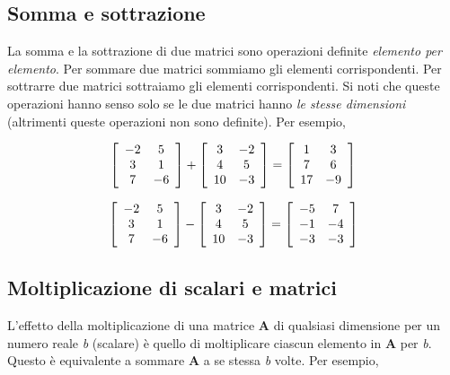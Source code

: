 \documentclass[
  11pt,
]{krantz}
\theoremstyle{definition}
\theoremstyle{definition}
\theoremstyle{definition}
\theoremstyle{definition}
\theoremstyle{remark}
\begin{document}
\hypertarget{somma-e-sottrazione}{%
\subsection{Somma e sottrazione}\label{somma-e-sottrazione}}

La somma e la sottrazione di due matrici sono operazioni definite \emph{elemento per elemento}. Per sommare due matrici sommiamo gli elementi corrispondenti. Per sottrarre due matrici sottraiamo gli elementi corrispondenti. Si noti che queste operazioni hanno senso solo se le due matrici hanno \emph{le stesse dimensioni} (altrimenti queste operazioni non sono definite). Per esempio,

\[\left[ \begin{array}{c c}
-2 & 5\\
3 & 1\\
7 & -6
\end{array}
 \right]+
\left[ \begin{array}{c c}
3 & -2\\
4 & 5\\
10 & -3
\end{array}
 \right]=
 \left[ \begin{array}{c c}
1 & 3\\
7 & 6\\
17 & -9
\end{array}
 \right]\]

\[\left[ \begin{array}{c c}
-2 & 5\\
3 & 1\\
7 & -6
\end{array}
 \right]-
\left[ \begin{array}{c c}
3 & -2\\
4 & 5\\
10 & -3
\end{array}
 \right]=
 \left[ \begin{array}{c c}
-5 & 7\\
-1 & -4\\
-3 & -3
\end{array}
 \right]\]

\hypertarget{moltiplicazione-di-scalari-e-matrici}{%
\subsection{Moltiplicazione di scalari e matrici}\label{moltiplicazione-di-scalari-e-matrici}}

L'effetto della moltiplicazione di una matrice \(\boldsymbol{A}\) di qualsiasi dimensione per un numero reale \emph{b} (scalare) è quello di moltiplicare ciascun elemento in \(\boldsymbol{A}\) per \emph{b}. Questo è equivalente a sommare \(\boldsymbol{A}\) a se stessa \emph{b} volte. Per esempio,
\end{document}
